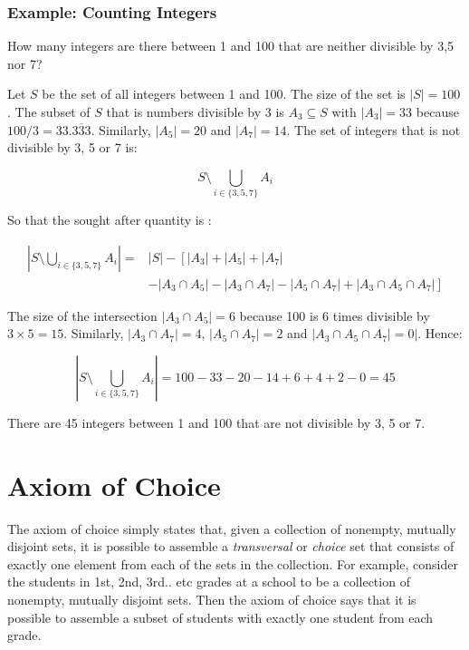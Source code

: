 \subsubsection{Example: Counting Integers}

How many integers are there between 1 and 100 that are neither divisible by 3,5 nor 7?

Let $S$ be the set of all integers between 1 and 100. The size of the set is $|S| = 100$. The subset of $S$ that is numbers divisible by 3 is $A_3 \subseteq S$ with $|A_3| = 33$ because $100/3 = 33.\overline{333}$. Similarly, $|A_5| = 20$ and $|A_7| = 14$.  The set of integers that is not divisible by 3, 5 or 7 is:

\begin{equation}
S \setminus \bigcup_{i\in\{3,5,7\}} A_i
\end{equation}

So that the sought after quantity is :

\begin{equation}
\begin{array}{rl}
\left|S \setminus \bigcup_{i\in\{3,5,7\}} A_i\right| =& |S| - \left[ |A_3| + |A_5| + |A_7| \right.\\
& \left. - |A_3 \cap A_5| - |A_3 \cap A_7| - |A_5\cap A_7| + |A_3\cap A_5\cap A_7|\right]
\end{array}
\end{equation}

The size of the intersection $|A_3\cap A_5| = 6$ because 100 is 6 times divisible by $3\times 5 = 15$. Similarly, $|A_3 \cap A_7| =  4$, $|A_5 \cap A_7| =  2$ and $|A_3\cap A_5 \cap A_7| =  0|$. Hence:

\begin{equation}
\left|S \setminus \bigcup_{i\in\{3,5,7\}} A_i\right| = 100 - 33 - 20 - 14 + 6 + 4 + 2 - 0 = 45
\end{equation}

There are 45 integers between 1 and 100 that are not divisible by 3, 5 or 7.


\section{Axiom of Choice}
\label{sec:axiomofchoice}
The axiom of choice simply states that, given a collection of nonempty, mutually disjoint sets, it is possible to assemble a \textit{transversal} or \textit{choice} set that consists of exactly one element from each of the sets in the collection. For example, consider the students in 1st, 2nd, 3rd.. etc grades at a school to be a collection of nonempty, mutually disjoint sets. Then the axiom of choice says that it is possible to assemble a subset of students with exactly one student from each grade. 


